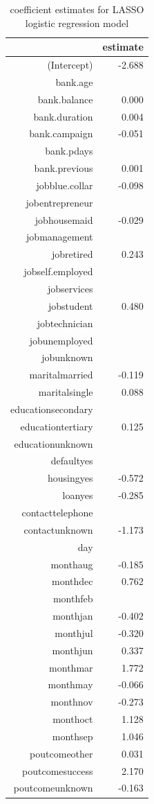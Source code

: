 \documentclass{article} %
\begin{document}
\begin{table}[t]
\caption{coefficient estimates for LASSO logistic regression model} 
\centering
{\small
\begin{tabular}{rr}
  \hline
 & estimate \\ 
  \hline
(Intercept) & -2.688 \\ 
  bank.age &  \\ 
  bank.balance & 0.000 \\ 
  bank.duration & 0.004 \\ 
  bank.campaign & -0.051 \\ 
  bank.pdays &  \\ 
  bank.previous & 0.001 \\ 
  jobblue.collar & -0.098 \\ 
  jobentrepreneur &  \\ 
  jobhousemaid & -0.029 \\ 
  jobmanagement &  \\ 
  jobretired & 0.243 \\ 
  jobself.employed &  \\ 
  jobservices &  \\ 
  jobstudent & 0.480 \\ 
  jobtechnician &  \\ 
  jobunemployed &  \\ 
  jobunknown &  \\ 
  maritalmarried & -0.119 \\ 
  maritalsingle & 0.088 \\ 
  educationsecondary &  \\ 
  educationtertiary & 0.125 \\ 
  educationunknown &  \\ 
  defaultyes &  \\ 
  housingyes & -0.572 \\ 
  loanyes & -0.285 \\ 
  contacttelephone &  \\ 
  contactunknown & -1.173 \\ 
  day &  \\ 
  monthaug & -0.185 \\ 
  monthdec & 0.762 \\ 
  monthfeb &  \\ 
  monthjan & -0.402 \\ 
  monthjul & -0.320 \\ 
  monthjun & 0.337 \\ 
  monthmar & 1.772 \\ 
  monthmay & -0.066 \\ 
  monthnov & -0.273 \\ 
  monthoct & 1.128 \\ 
  monthsep & 1.046 \\ 
  poutcomeother & 0.031 \\ 
  poutcomesuccess & 2.170 \\ 
  poutcomeunknown & -0.163 \\ 
   \hline
\end{tabular}
}
\end{table}
\end{document}
